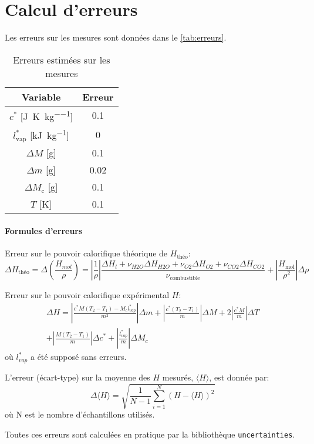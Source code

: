 \section{Calcul d'erreurs}
\label{sec:erreurs}

Les erreurs sur les mesures sont données dans le \autoref{tab:erreurs}.

\begin{table}[h]
    \centering
    \begin{tabulary}{\textwidth}{C C}
        \toprule
        Variable & Erreur \\
        \midrule
        \(c^*\) [\si{\joule\per\kelvin\per\kilo\gram}] & 0.1 \\
        \(l_\textrm{vap}^*\) [\si{\kilo\joule\per\kilo\gram}] & 0 \\
        \(\Delta M\) [\si{\gram}] & 0.1 \\
        \(\Delta m\) [\si{\gram}] & 0.02 \\
        \(\Delta M_\textrm{c}\) [\si{\gram}] & 0.1 \\
        \(T\) [\si{\kelvin}] & 0.1 \\
        \bottomrule
    \end{tabulary}
    \caption{Erreurs estimées sur les mesures}
    \label{tab:erreurs}
\end{table}


\paragraph*{Formules d'erreurs}

Erreur sur le pouvoir calorifique théorique de \(H_\textrm{théo}\):
\begin{equation}
    \Delta H_\textrm{théo} = \Delta\left(\frac{H_{mol}}{\rho}\right) = \left|\frac{1}{\rho}\right| \frac{\Delta H_{l} + \nu_{H2O} \Delta H_{H2O} + \nu_{O2} \Delta H_{O2} + \nu_{CO2} \Delta H_{CO2}}{\nu_\textrm{combustible}} + \left|\frac{H_\textrm{mol}}{\rho^2}\right| \Delta\rho
\end{equation}

Erreur sur le pouvoir calorifique expérimental \(H\):
\begin{multline}
    \Delta H = \left|\frac{c^* M (T_2 - T_1) - M_c l^*_{vap}}{m^2}\right| \Delta m + \left|\frac{c^* (T_2 - T_1)}{m}\right| \Delta M + 2 \left|\frac{c^* M}{m}\right| \Delta T \\+ \left|\frac{M (T_2 - T_1)}{m}\right| \Delta c^* + \left|\frac{l^*_{vap}}{m}\right| \Delta M_c
\end{multline}
où \(l^*_{vap}\) a été supposé sans erreurs.

L'erreur (écart-type) sur la moyenne des \(H\) mesurés, \(\langle H \rangle\), est donnée par:
\begin{equation}
    \Delta \langle H \rangle = \sqrt{\frac{1}{N - 1}\sum_{i=1}^{N}(H - \langle H \rangle)^2}
\end{equation}
où N est le nombre d'échantillons utilisés.

Toutes ces erreurs sont calculées en pratique par la bibliothèque \texttt{uncertainties}.
